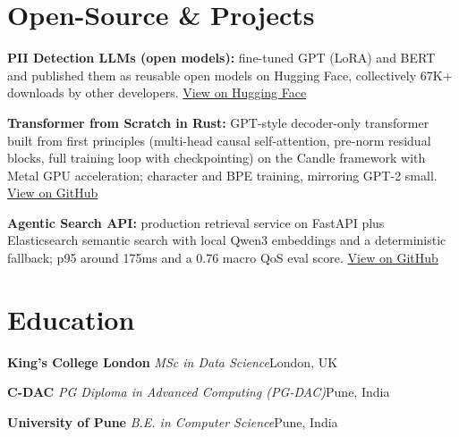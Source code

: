 \documentclass[10pt,a4paper]{article}
\newcommand{\sep}{\,\textcolor{accent!60}{\textbar}\,}
\begin{document}
\section{Open-Source \& Projects}
\begin{tight}
  \item \textbf{PII Detection LLMs (open models):} fine-tuned GPT (LoRA) and BERT and published them as reusable open models on Hugging Face, collectively 67K+ downloads by other developers. \href{https://huggingface.co/ab-ai/pii_model}{View on Hugging Face}
  \item \textbf{Transformer from Scratch in Rust:} GPT-style decoder-only transformer built from first principles (multi-head causal self-attention, pre-norm residual blocks, full training loop with checkpointing) on the Candle framework with Metal GPU acceleration; character and BPE training, mirroring GPT-2 small. \href{https://github.com/abhijeetscode/transformer-rust}{View on GitHub}
  \item \textbf{Agentic Search API:} production retrieval service on FastAPI plus Elasticsearch semantic search with local Qwen3 embeddings and a deterministic fallback; p95 around 175ms and a 0.76 macro QoS eval score. \href{https://github.com/abhijeetscode/search-agent}{View on GitHub}
\end{tight}

\section{Education}
{\color{company}\bfseries King's College London}\sep{\itshape MSc in Data Science}\hfill {\color{muted}London, UK}\par\vspace{1pt}
{\color{company}\bfseries C-DAC}\sep{\itshape PG Diploma in Advanced Computing (PG-DAC)}\hfill {\color{muted}Pune, India}\par\vspace{1pt}
{\color{company}\bfseries University of Pune}\sep{\itshape B.E. in Computer Science}\hfill {\color{muted}Pune, India}\par
\end{document}
